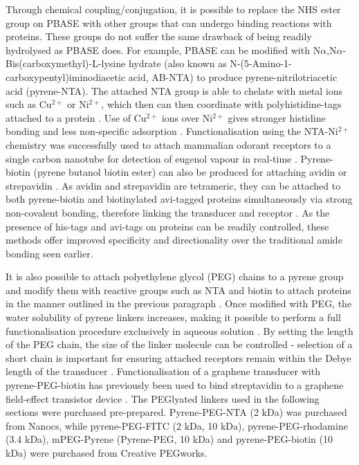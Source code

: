 \documentclass[
  a4paper,
]{scrbook}
\begin{document}
Through chemical coupling/conjugation, it is possible to replace the NHS
ester group on PBASE with other groups that can undergo binding
reactions with proteins. These groups do not suffer the same drawback of
being readily hydrolysed as PBASE does. For example, PBASE can be
modified with N\(\alpha\),N\(\alpha\)-Bis(carboxymethyl)-L-lysine
hydrate (also known as N-(5-Amino-1-carboxypentyl)iminodiacetic acid,
AB-NTA) to produce pyrene-nitrilotriacetic acid (pyrene-NTA). The
attached NTA group is able to chelate with metal ions such as
Cu\(^{2+}\) or Ni\(^{2+}\), which then can then coordinate with
polyhistidine-tags attached to a protein
\autocite{Holzinger2011,Amano2016,Chang2017}. Use of Cu\(^{2+}\) ions
over Ni\(^{2+}\) gives stronger histidine bonding and less non-specific
adsorption \autocite{Chang2017}. Functionalisation using the
NTA-Ni\(^{2+}\) chemistry was successfully used to attach mammalian
odorant receptors to a single carbon nanotube for detection of eugenol
vapour in real-time \autocite{Goldsmith2011}. Pyrene-biotin (pyrene
butanol biotin ester) can also be produced for attaching avidin or
strepavidin \autocite{Holzinger2011}. As avidin and strepavidin are
tetrameric, they can be attached to both pyrene-biotin and biotinylated
avi-tagged proteins simultaneously via strong non-covalent bonding,
therefore linking the transducer and receptor
\autocite{Star2003a,Dundas2013,Hermanson2013-11,Fairhead2015}. As the
presence of his-tags and avi-tags on proteins can be readily controlled,
these methods offer improved specificity and directionality over the
traditional amide bonding seen earlier.

It is also possible to attach polyethylene glycol (PEG) chains to a
pyrene group and modify them with reactive groups such as NTA and biotin
to attach proteins in the manner outlined in the previous paragraph
\autocite{Hermanson2013-18,Meran2018}. Once modified with PEG, the water
solubility of pyrene linkers increases, making it possible to perform a
full functionalisation procedure exclusively in aqueous solution
\autocite{Hermanson2013-18}. By setting the length of the PEG chain, the
size of the linker molecule can be controlled - selection of a short
chain is important for ensuring attached receptors remain within the
Debye length of the transducer \autocite{Shkodra2021}. Functionalisation
of a graphene transducer with pyrene-PEG-biotin has previously been used
to bind streptavidin to a graphene field-effect transistor device
\autocite{Miki2019}. The PEGlyated linkers used in the following
sections were purchased pre-prepared. Pyrene-PEG-NTA (2 kDa) was
purchased from Nanocs, while pyrene-PEG-FITC (2 kDa, 10 kDa),
pyrene-PEG-rhodamine (3.4 kDa), mPEG-Pyrene (Pyrene-PEG, 10 kDa) and
pyrene-PEG-biotin (10 kDa) were purchased from Creative PEGworks.
\end{document}
